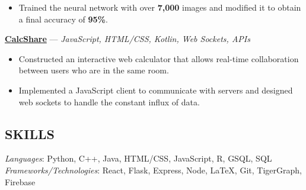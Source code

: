\documentclass[11pt]{res}
\begin{document}
\begin{footnotesize}
\begin{resume}
\begin{itemize}[leftmargin=6.25mm]
\vspace{1.30mm}
\item Trained the neural network with over \textbf{7,000} images and modified it to obtain a final accuracy of \textbf{95\%}. 
\end{itemize}
\vspace{-2.5mm}
\href{https://github.com/CharlesShi12/CalcShare}{\textbf{CalcShare}} — {\sl JavaScript, HTML/CSS, Kotlin, Web Sockets, APIs} \vspace{-4.5mm}
\begin{itemize}[leftmargin=6.25mm] \itemsep -2pt 
\item Constructed an interactive web calculator that allows real-time collaboration between users who are in the same room. 
\vspace{1.30mm}
\item Implemented a JavaScript client to communicate with servers and designed web sockets to handle the constant influx of data.
\end{itemize}
\vspace{-2mm}
\begin{small}
\section{SKILLS}
\end{small} 
\vspace{.5mm}
{\sl Languages}: 
Python, C++, Java, HTML/CSS, JavaScript, R, GSQL, SQL\\
{\sl Frameworks/Technologies}: React, Flask, Express, Node, LaTeX, Git, TigerGraph, Firebase

\end{resume}
\end{footnotesize}
\end{document}
